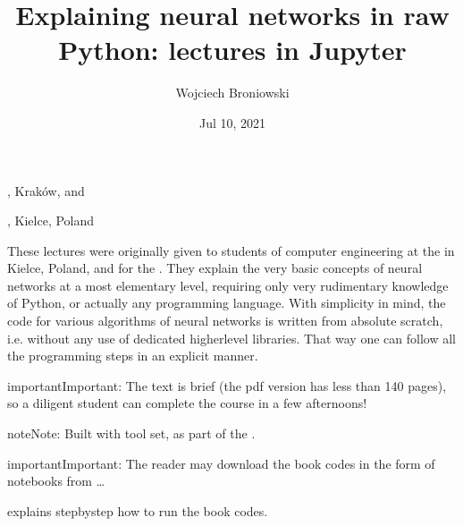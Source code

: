 \documentclass[letterpaper,10pt,english]{jupyterBook}
\title{Explaining neural networks in raw Python: lectures in Jupyter}
\date{Jul 10, 2021}
\author{Wojciech Broniowski}
\begin{document}
\pagestyle{empty}
\sphinxmaketitle
\pagestyle{plain}
\sphinxtableofcontents
\pagestyle{normal}
\label{\detokenize{docs/index::doc}}


\sphinxAtStartPar
{}

\sphinxAtStartPar
{}, Kraków, and

\sphinxAtStartPar
{}, Kielce, Poland



\sphinxAtStartPar
These lectures were originally given to students of computer engineering at the  in Kielce, Poland, and for
the . They explain the very basic concepts of neural networks at a most elementary level, requiring only very rudimentary knowledge of Python, or actually any programming language. With simplicity in mind, the code for various algorithms of neural networks is written from absolute scratch, i.e. without any use of dedicated higher\sphinxhyphen{}level libraries. That way one can follow all the programming steps in an explicit manner.

\begin{sphinxadmonition}{important}{Important:}
\sphinxAtStartPar
The text is brief (the pdf version has less than 140 pages), so a diligent student can complete the course in a few afternoons!
\end{sphinxadmonition}

\begin{sphinxadmonition}{note}{Note:}
\sphinxAtStartPar
Built with  tool set, as part of the
.
\end{sphinxadmonition}

\begin{sphinxadmonition}{important}{Important:}
\sphinxAtStartPar
The reader may download the book codes in the form of
 notebooks from …

\sphinxAtStartPar
{\hyperref[\detokenize{docs/appendix:app-lab}]{}} explains step\sphinxhyphen{}by\sphinxhyphen{}step how to run the book codes.
\end{sphinxadmonition}
\end{document}
